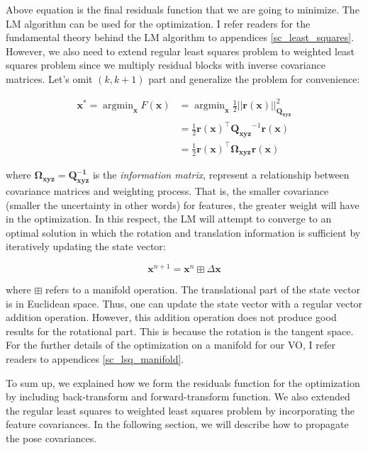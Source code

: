 \documentclass[a4paper]{report}
\numberwithin{figure}{section}
\newcommand{\argmin}{\mathop{\mathrm{argmin}}}
\begin{document}
Above equation is the final residuals function that we are going to minimize.
The LM algorithm can be used for the optimization. I refer readers for the
fundamental theory behind the LM algorithm to appendices
\ref{sc_least_squares}.  However, we also need to extend regular least squares
problem to weighted least squares problem since we multiply residual blocks
with inverse covariance matrices.  Let's omit $(k,k+1)$ part and generalize the
problem for convenience:

\begin{equation} \begin{aligned} \mathbf{x}^* = \argmin_{\mathbf{x}}
F(\mathbf{x}) & = \argmin_{\mathbf{x}} \frac{1}{2}
||\mathbf{r}(\mathbf{x})||^2_{\mathbf{Q_{xyz}}} \\ & = \frac{1}{2}
\mathbf{r}(\mathbf{x})^\top \mathbf{Q_{xyz}}^{-1} \mathbf{r}(\mathbf{x}) 
\\ & =
\frac{1}{2} \mathbf{r}(\mathbf{x})^\top \mathbf{\Omega}_{\mathbf{xyz}}
\mathbf{r}(\mathbf{x}) \end{aligned}
\end{equation}\label{eq:residuals_objective}

where $\mathbf{\Omega_{xyz} = Q^{-1}_{xyz}}$ is the \textit{information
matrix}, represent a relationship between covariance matrices and weighting
process.  That is, the smaller covariance (smaller the uncertainty in other
words) for features, the greater weight will have in the optimization.  In this
respect, the LM will attempt to converge to an optimal solution in which the
rotation and translation information is sufficient by iteratively updating the
state vector:

\begin{equation} \mathbf{x}^{n+1} = \mathbf{x}^{n} \boxplus \Delta \mathbf{x}
\end{equation}

where $\boxplus$ refers to a manifold operation.  The translational part of the
state vector is in Euclidean space. Thus, one can update the state vector with
a regular vector addition operation.  However, this addition operation does not
produce good results for the rotational part. This is because the rotation is
the tangent space.  For the further details of the optimization on a manifold
for our VO, I refer readers to appendices \ref{sc_lsq_manifold}.

To sum up, we explained how we form the residuals function for the optimization
by including back-transform and forward-transform function. We also extended
the regular least squares to weighted least squares problem by incorporating
the feature covariances. In the following section, we will describe how to
propagate the pose covariances.
\end{document}
